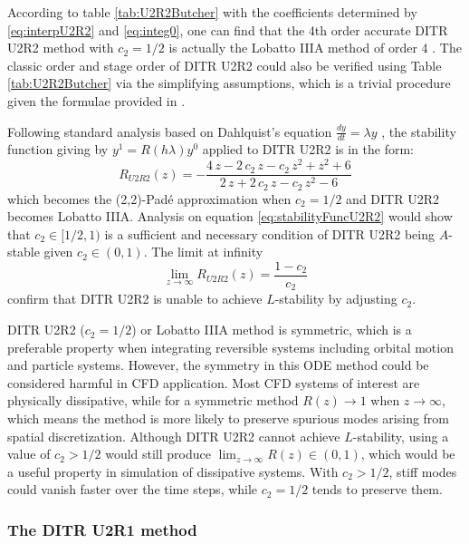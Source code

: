 According to table \ref{tab:U2R2Butcher} with the coefficients
determined by \eqref{eq:interpU2R2} and \eqref{eq:integ0},
one can find that the 4th order accurate
DITR U2R2 method with $c_2=1/2$
is actually the Lobatto IIIA method
of order 4 \cite{wanner1996solving}.
The classic order and stage order of DITR U2R2 could
also be verified using Table \ref{tab:U2R2Butcher} via
the simplifying assumptions, which is a trivial procedure
given the formulae provided in \cite{wanner1996solving}.

Following standard analysis based on Dahlquist's equation
$\frac{dy}{dt} = \lambda y$ \cite{wanner1996solving},
the stability function giving by $y^{1}=R(h\lambda)y^0$
applied to DITR U2R2 is in the form:
\begin{equation}
    \label{eq:stabilityFuncU2R2}
    R_{U2R2}(z) = -\frac{4\,z-2\,c_{2}\,z-c_{2}\,z^2+z^2+6}{2\,z+2\,c_{2}\,z-c_{2}\,z^2-6}
\end{equation}
which becomes the (2,2)-Pad{\'e} approximation when $c_2=1/2$ and
DITR U2R2 becomes Lobatto IIIA.
Analysis on equation \eqref{eq:stabilityFuncU2R2}
would show that $c_2\in[1/2,1)$ is a sufficient and necessary
condition of DITR U2R2 being $A$-stable given $c_2\in(0,1)$.
The limit at infinity
\begin{equation}
    \lim_{z\rightarrow\infty}R_{U2R2}(z) = \frac{1-c_2}{c_2}
\end{equation}
confirm that DITR U2R2 is unable to achieve $L$-stability
by adjusting $c_2$.


DITR U2R2 ($c_2=1/2$) or Lobatto IIIA method is symmetric,
which is a preferable property when integrating
reversible systems including orbital motion and particle
systems.
However,
the symmetry in this ODE method could be considered harmful in CFD application.
Most CFD systems of interest are physically dissipative,
while for a symmetric method
$R(z) \rightarrow 1$ when $z \rightarrow \infty$,
which means the method is more likely to preserve
spurious modes arising from spatial discretization.
Although DITR U2R2 cannot achieve $L$-stability,
using a value of $c_2 > 1/2$ would still
produce $\lim_{z\rightarrow\infty}R(z)\in(0,1)$, which
would be a useful property in simulation of dissipative systems.
With  $c_2 > 1/2$, stiff modes could vanish faster over the time
steps, while $c_2 = 1/2$ tends to preserve them.

\subsubsection{The DITR U2R1 method}

